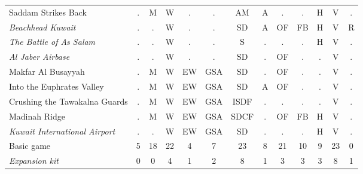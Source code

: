 \documentclass[a4paper]{article}
\newenvironment{texte}{\rmfamily\footnotesize}{}
\begin{document}
\begin{texte}
\begin{tabular}{lcccccccccccc}
     Saddam Strikes Back                           & . &  M &  W &  . &  .  & AM    & A &  . &  . & H &  V & . \\
\it  Beachhead Kuwait                              & . &  . &  W &  . &  .  & SD    & A & OF & FB & H &  V & R \\
\it  The Battle of As Salam                        & . &  . &  W &  . &  .  & S     & . &  . &  . & H &  V & . \\
\it  Al Jaber Airbase                              & . &  . &  W &  . &  .  & SD    & . & OF &  . & . &  V & . \\
     Makfar Al Busayyah                            & . &  M &  W & EW & GSA & SD    & . & OF &  . & . &  V & . \\
     Into the Euphrates Valley                     & . &  M &  W & EW & GSA & SD    & A & OF &  . & . &  V & . \\
     Crushing the Tawakalna Guards                 & . &  M &  W & EW & GSA & ISDF  & . &  . &  . & . &  V & . \\
     Madinah Ridge                                 & . &  M &  W & EW & GSA & SDCF  & . & OF & FB & H &  V & . \\
\it  Kuwait International Airport                  & . &  . &  W & EW & GSA & SD    & . &  . &  . & H &  V & . \\
\hline
    Basic game                                     & 5 & 18 & 22 &  4 &  7  & 23 & 8 & 21 & 10 & 9 & 23 & 0 \\
\it Expansion kit                                  & 0 &  0 &  4 &  1 &  2  &  8 & 1 &  3 &  3 & 3 &  8 & 1 \\
\end{tabular}

\end{texte}
\end{document}

